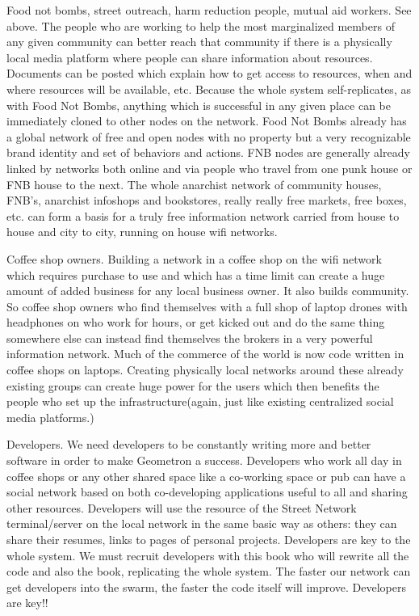 Food not bombs, street outreach, harm reduction people, mutual aid workers.  See above.  The people who are working to help the most marginalized members of any given community can better reach that community if there is a physically local media platform where people can share information about resources.  Documents can be posted which explain how to get access to resources, when and where resources will be available, etc.  Because the whole system self-replicates, as with Food Not Bombs, anything which is successful in any given place can be immediately cloned to other nodes on the network.  Food Not Bombs already has a global network of free and open nodes with no property but a very recognizable brand identity and set of behaviors and actions.  FNB nodes are generally already linked by networks both online and via people who travel from one punk house or FNB house to the next.  The whole anarchist network of community houses, FNB's, anarchist infoshops and bookstores, really really free markets, free boxes, etc. can form a basis for a truly free information network carried from house to house and city to city, running on house wifi networks.  

Coffee shop owners.  Building a network in a coffee shop on the wifi network which requires purchase to use and which has a time limit can create a huge amount of added business for any local business owner.  It also builds community. So coffee shop owners who find themselves with a full shop of laptop drones with headphones on who work for hours, or get kicked out and do the same thing somewhere else can instead find themselves the brokers in a very powerful information network.  Much of the commerce of the world is now code written in coffee shops on laptops.  Creating physically local networks around these already existing groups can create huge power for the users which then benefits the people who set up the infrastructure(again, just like existing centralized social media platforms.)

Developers.  We need developers to be constantly writing more and better software in order to make Geometron a success. Developers who work all day in coffee shops or any other shared space like a co-working space or pub can have a social network based on both co-developing applications useful to all and sharing other resources.  Developers will use the resource of the Street Network terminal/server on the local network in the same basic way as others: they can share their resumes, links to pages of personal projects.  Developers are key to the whole system. We must recruit developers with this book who will rewrite all the code and also the book, replicating the whole system.  The faster our network can get developers into the swarm, the faster the code itself will improve.  Developers are key!!

